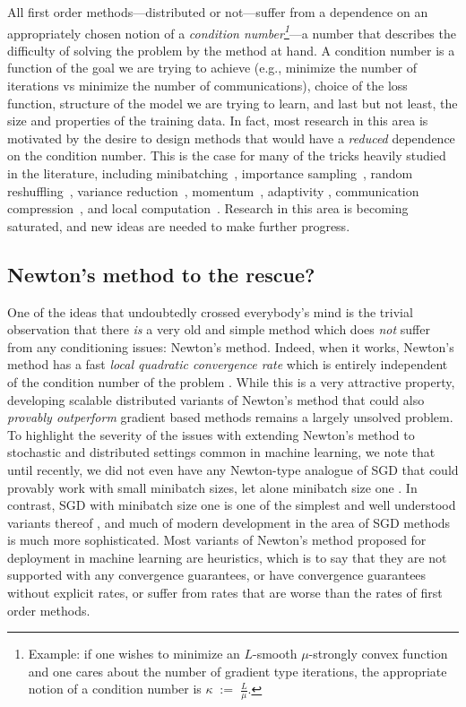 \documentclass[10pt]{article}
\newcommand{\eqdef}{\; { := }\;}
\begin{document}
All first order methods---distributed or not---suffer from a dependence on an appropriately chosen notion of a {\em condition number\footnote{Example: if one wishes to minimize an $L$-smooth $\mu$-strongly convex function  and one cares about the number of gradient type iterations, the appropriate notion of a condition number is $\kappa \eqdef \frac{L}{\mu}$.}}---a number that describes the difficulty of solving the problem by the method at hand. A condition number is a function of the goal we are trying to achieve (e.g., minimize the number of iterations vs minimize the  number of communications), choice of the loss function, structure of the model we are trying to learn, and last but not least, the size and properties of the training data. In fact, most research in this area is motivated by the desire to design methods that would have a {\em reduced} dependence on the condition number. This is the case for many of the tricks heavily studied in the literature, including minibatching~\citep{pegasos2}, importance sampling~\citep{NeedellWard2015, IProx-SDCA}, random reshuffling~\citep{RR}, variance reduction~\citep{schmidt2017minimizing, johnson2013accelerating, proxSVRG, SAGA}, momentum~\citep{SHB-NIPS, SMOMENTUM}, adaptivity \citep{MM2019}, communication compression~\citep{Alistarh17, Bernstein18, DIANA}, and local computation~\citep{COCOA+journal, localSGD-Stich,localSGD-AISTATS2020}.  Research in this area is becoming saturated, and new ideas are needed to make further progress.

\subsection{Newton's method to the rescue?} One of the ideas that undoubtedly crossed everybody's mind is the trivial observation that there {\em is} a very old and simple method which does {\em not} suffer from any conditioning issues: Newton's method. Indeed, when it works, Newton's method has a fast {\em local quadratic convergence rate} which is entirely independent of the condition number of the problem \citep{Beck-book-nonlinear}. While this is a very attractive property, developing  scalable distributed variants of Newton's method that could also {\em provably outperform} gradient based methods remains a largely unsolved problem. To highlight the severity of the issues with extending Newton's method to stochastic and distributed settings common in machine learning, we note that until recently, we did not even have any Newton-type analogue of SGD that could provably work with small minibatch sizes, let alone minibatch size one \citep{SN2019}. In contrast, SGD with minibatch size one is one of the simplest and well understood variants thereof \citep{NeedellWard2015}, and much of modern development in the area of SGD methods is much more sophisticated.  Most variants of Newton's method proposed for deployment in machine learning are heuristics, which is to say that they are not supported with any convergence guarantees, or have convergence guarantees without explicit rates, or suffer from rates that are worse than the rates of first order methods.  
\end{document}
